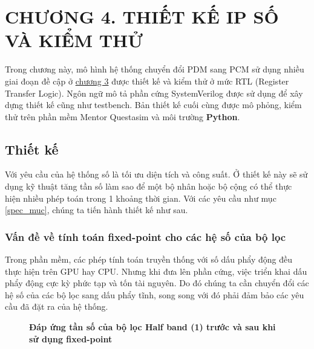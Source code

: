 \section*{CHƯƠNG 4. THIẾT KẾ IP SỐ VÀ KIỂM THỬ} \label{chuong4}
\setcounter{section}{4}
\setcounter{subsection}{0}
\setcounter{figure}{0}
\setcounter{table}{0}
Trong chương này, mô hình hệ thống chuyển đổi PDM sang PCM sử dụng nhiều giai đoạn đề cập ở \hyperref[chuong3]{chương 3} được thiết kế và kiểm thử ở mức RTL (Register Transfer Logic). Ngôn ngữ mô tả phần cứng SystemVerilog được sử dụng để xây dựng thiết kế cũng như testbench. Bản thiết kế cuối cùng được mô phỏng, kiểm thử trên phần mềm Mentor Questasim và môi trường \textbf{Python}.
\subsection{Thiết kế}
Với yêu cầu của hệ thống số là tối ưu diện tích và công suất. Ở thiết kế này sẽ sử dụng kỹ thuật tăng tần số làm sao để một bộ nhân hoặc bộ cộng có thể thực hiện nhiều phép toán trong 1 khoảng thời gian. Với các yêu cầu như mục \ref{spec_muc}, chúng ta tiến hành thiết kế như sau.
\subsubsection{Vấn đề về tính toán fixed-point cho các hệ số của bộ lọc} \label{fix-fil}
Trong phần mềm, các phép tính toán truyền thống với số dấu phẩy động đều thực hiện
trên GPU hay CPU. Nhưng khi đưa lên phần cứng, việc triển khai dấu phẩy động cực kỳ phức tạp và tốn tài nguyên. Do đó chúng ta cần chuyển đổi các hệ số của các bộ lọc sang dấu phẩy tĩnh, song song với đó phải đảm bảo các yêu cầu đã đặt ra của hệ thống.
\begin{figure}[H]
    \centering
    
    \caption[Đáp ứng tần số của bộ lọc Half band (1) trước và sau khi sử dụng fixed-point]{\bfseries \fontsize{12pt}{0pt}\selectfont Đáp ứng tần số của bộ lọc Half band (1) trước và sau khi sử dụng fixed-point}
    \label{hb1_d}
\end{figure}

